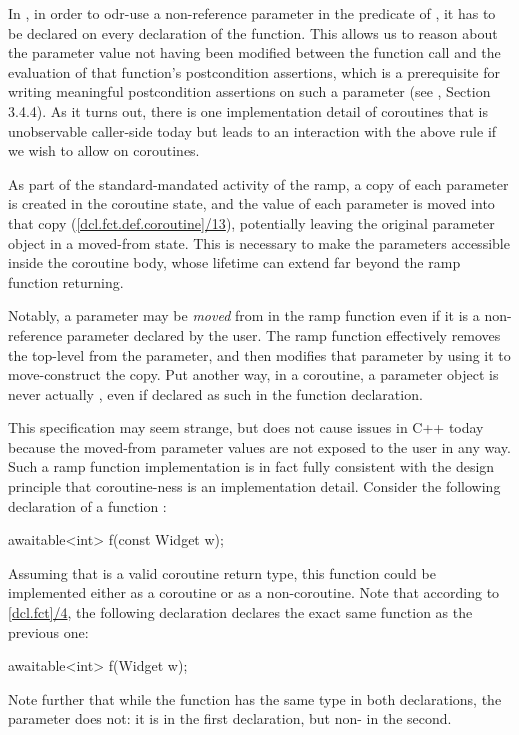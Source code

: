 In \cite{P2900R8}, in order to odr-use a non-reference parameter in the predicate of , it has to be declared  on every declaration of the function. This allows us to reason about the parameter value not having been modified between the function call and the evaluation of that function's postcondition assertions, which is a prerequisite for writing meaningful postcondition assertions on such a parameter (see \cite{P2900R8}, Section 3.4.4). As it turns out, there is one implementation detail of coroutines that is unobservable caller-side today but leads to an interaction with the above rule if we wish to allow  on coroutines.

As part of the standard-mandated activity of the ramp, a copy of each parameter is created in the coroutine state, and the value of each parameter is moved into that copy (\href{https://eel.is/c++draft/dcl.fct.def.coroutine#13}{[dcl.fct.def.coroutine]/13}), potentially leaving the original parameter object in a moved-from state. This is necessary to make the parameters accessible inside the coroutine body, whose lifetime can extend far beyond the ramp function returning.

Notably, a parameter may be \emph{moved} from in the ramp function even if it is a non-reference parameter declared  by the user. The ramp function effectively removes the top-level  from the parameter, and then modifies that parameter by using it to move-construct the copy. Put another way, in a coroutine, a parameter object is never actually , even if declared as such in the function declaration.

This specification may seem strange, but does not cause issues in C++ today because the moved-from parameter values are not exposed to the user in any way. Such a ramp function implementation is in fact fully consistent with the design principle that coroutine-ness is an implementation detail. Consider the following declaration of a function :
\begin{codeblock}
awaitable<int> f(const Widget w);
\end{codeblock}
Assuming that  is a valid coroutine return type, this function could be  implemented either as a coroutine or as a non-coroutine. Note that according to \href{https://eel.is/c++draft/dcl.fct#4.sentence-2}{[dcl.fct]/4}, the following declaration declares the exact same function as the previous one:
\begin{codeblock}
awaitable<int> f(Widget w);
\end{codeblock}
Note further that while the function  has the same type in both declarations, the parameter  does not: it is  in the first declaration, but non- in the second.

